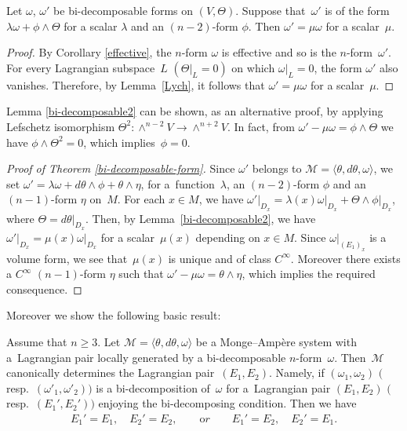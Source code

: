 \begin{Lem}
\label{bi-decomposable2}
Let $\omega$, ${\omega}'$ be bi-decomposable forms on $(V, \Theta)$.
Suppose that~${\omega}'$ is of the form
$\lambda \omega+\phi \wedge \Theta$
for a scalar $\lambda$ and an $(n-2)$-form $\phi$.
Then ${\omega}' = \mu\omega$ for a scalar~$\mu$.
\end{Lem}

\begin{proof}
By Corollary \ref{effective}, the $n$-form $\omega$ is ef\/fective
and so is the $n$-form~${\omega}'$.
For every Lagrangian subspace~$L$ $(\Theta\vert_L = 0)$ on which
$\omega\vert_L = 0$,
the form $\omega'$ also vanishes.
Therefore, by Lemma~\ref{Lych},
it follows that
$\omega' =\mu{\omega}$
for a scalar~$\mu$.
\end{proof}

\begin{Rem}
Lemma \ref{bi-decomposable2} can be shown, as an alternative proof, by
applying Lefschetz isomorphism $\Theta^2\colon
\wedge^{n-2} V \to \wedge^{n+2} V$. In fact, from ${\omega}' - \mu\omega = \phi \wedge \Theta$
we have $\phi\wedge \Theta^2 = 0$, which implies~$\phi = 0$.
\end{Rem}


\begin{proof}[Proof of Theorem \ref{bi-decomposable-form}]
Since $\omega'$ belongs to ${\mathcal M} = \langle \theta, d\theta, \omega
\rangle$,
we set $\omega' = \lambda\omega +  d\theta\wedge\phi + \theta\wedge \eta$,
for a~function~$\lambda$, an $(n-2)$-form $\phi$ and an $(n-1)$-form $\eta$
on~$M$.
For each $x \in M$, we have
$\omega'\vert_{D_x} = \lambda(x)\omega\vert_{D_x} +
\Theta\wedge\phi\vert_{D_x}$,
where $\Theta = d\theta\vert_{D_x}$.
Then, by Lemma~\ref{bi-decomposable2}, we have
$\omega'\vert_{D_x} = \mu(x)\omega\vert_{D_x}$ for a scalar~$\mu(x)$
depending on $x \in M$.
Since $\omega\vert_{(E_1)_x}$ is a volume form, we see that~$\mu(x)$
is unique and
of class $C^\infty$. Moreover there exists a $C^\infty$ $(n-1)$-form $\eta$
such that $\omega' - \mu\omega = \theta \wedge \eta$, which implies
the required consequence.
\end{proof}


Moreover we show the following basic result:
\begin{Th}\label{Uniqueness}
Assume that $n\geq 3$.
Let
$\mathcal{M}=
\langle \theta, d\theta, \omega \rangle$ be
a Monge--Amp{\`e}re system
with a~Lag\-rangian pair locally generated by a bi-decomposable
$n$-form~$\omega$. Then~$\mathcal{M}$
canonically determines the Lagrangian pair~$(E_1,E_2)$.
Namely, if $(\omega_1, \omega_2)$
$($resp.\ $(\omega'_1, \omega'_2))$
is a bi-decomposition of~$\omega$ for
a~Lag\-rangian pair $(E_1,E_2)$ $($resp.~$(E_1', E_2'))$
enjoying the bi-decomposing condition.
Then we have
\begin{gather*}
E_1'=E_1,\quad  E_2'=E_2, \qquad {\mathrm or} \qquad
E_1' = E_2, \quad  E_2' = E_1.
\end{gather*}
\end{Th}

